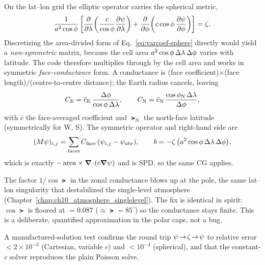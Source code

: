 On the lat--lon grid the elliptic operator carries the spherical metric,
\begin{equation}\label{eq:varcoef-sphere}
  \frac{1}{a^{2}\cos\phi}
  \left[\frac{\partial }{\partial \lambda}\!\left(\frac{c}{\cos\phi}\frac{\partial \psi}{\partial \lambda}\right)
       +\frac{\partial }{\partial \phi}\!\left(c\cos\phi\,\frac{\partial \psi}{\partial \phi}\right)\right]=\zeta .
\end{equation}
Discretizing the area-divided form of Eq.~\eqref{eq:varcoef-sphere} directly would yield a
\emph{non-symmetric} matrix, because the cell area $a^{2}\cos\phi\,\Delta\lambda\,\Delta\phi$
varies with latitude. The code therefore multiplies through by the cell area and works in
symmetric \emph{face-conductance} form. A conductance is (face coefficient)$\times$(face
length)$/$(centre-to-centre distance); the Earth radius cancels, leaving
\begin{equation}
  C_{\mathrm E}=\bar c_{\mathrm E}\,\frac{\Delta\phi}{\cos\phi\,\Delta\lambda},\qquad
  C_{\mathrm N}=\bar c_{\mathrm N}\,\frac{\cos\phi_{\mathrm N}\,\Delta\lambda}{\Delta\phi},
\end{equation}
with $\bar c$ the face-averaged coefficient and $\lat_{\mathrm N}$ the north-face latitude
(symmetrically for W, S). The symmetric operator and right-hand side are
\begin{equation}\label{eq:sphere-op}
  (M\psi)_{i,j}=\sum_{\mathrm{faces}}C_{\mathrm{face}}\,(\psi_{i,j}-\psi_{\mathrm{nbr}}),
  \qquad b=-\zeta\,\big(a^{2}\cos\phi\,\Delta\lambda\,\Delta\phi\big),
\end{equation}
which is exactly $-\,\mathrm{area}\times\boldsymbol{\nabla}\!\cdot\!(c\boldsymbol{\nabla}\psi)$ and is SPD, so the same CG applies.

\begin{remark}
The factor $1/\cos\lat$ in the zonal conductance blows up at the pole, the same lat--lon
singularity that destabilized the single-level atmosphere (Chapter~\ref{chap:ch10_atmosphere_singlelevel}).
The fix is identical in spirit: $\cos\lat$ is floored at $=0.087$
($\approx\lat=85^\circ$) so the conductance stays finite. This is a deliberate, quantified
approximation in the polar caps, not a bug.
\end{remark}

A manufactured-solution test confirms the round trip $\psi\!\to\!\zeta\!\to\!\psi$ to
relative error $<2\times10^{-3}$ (Cartesian, variable $c$) and $<10^{-4}$ (spherical), and that
the constant-$c$ solver reproduces the plain Poisson solve.

